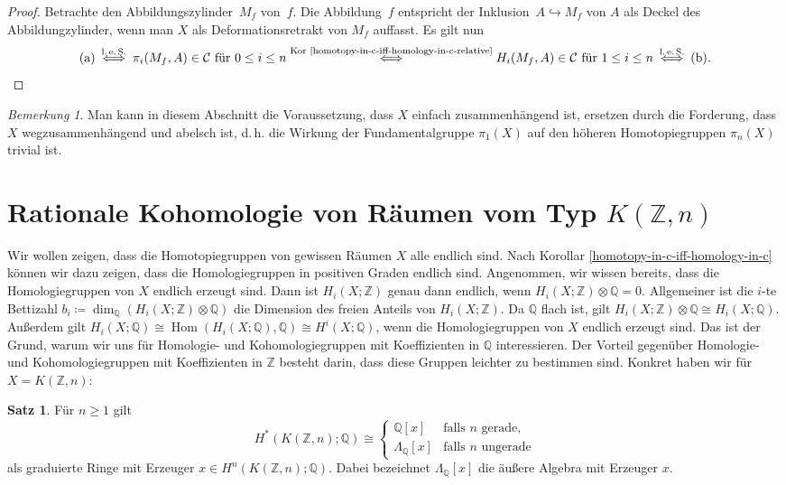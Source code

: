 \documentclass[11pt, a4paper, german]{article}
\theoremstyle{definition}
\newtheorem{satz}[lem]{Satz}
\theoremstyle{remark}
\newtheorem*{bem}{Bemerkung}
\newcommand{\Z}{\mathbb{Z}} %
\newcommand{\Q}{\mathbb{Q}} %
\DeclareMathOperator{\Hom}{Hom} %
\newcommand{\SC}{\mathcal{C}} %
\renewcommand{\dh}{d.\,h.} %
\begin{document}
\begin{proof}
  Betrachte den Abbildungszylinder~$M_f$ von~$f$.
  Die Abbildung~$f$ entspricht der Inklusion~$A \hookrightarrow M_f$ von $A$ als Deckel des Abbildungzylinder, wenn man $X$ als Deformationsretrakt von $M_f$ auffasst.
  Es gilt nun
  \[
    \text{(a)}
    \stackrel{\text{l.\,e.\,S.}}{\iff}
    \pi_i(M_f, A) \in \SC \text{ für } 0 \leq i \leq n
    \stackrel{\text{Kor \ref{homotopy-in-c-iff-homology-in-c-relative}}}{\iff}
    H_i(M_f, A) \in \SC \text{ für } 1 \leq i \leq n
    \stackrel{\text{l.\,e.\,S.}}{\iff}
    \text{(b)}.
    \qedhere
  \]
\end{proof}

\begin{bem}
  Man kann in diesem Abschnitt die Voraussetzung, dass $X$ einfach zusammenhängend ist, ersetzen durch die Forderung, dass $X$ wegzusammenhängend und abelsch ist, \dh{} die Wirkung der Fundamentalgruppe $\pi_1(X)$ auf den höheren Homotopiegruppen $\pi_n(X)$ trivial ist.
\end{bem}

\section{Rationale Kohomologie von Räumen vom Typ $K(\Z, n)$}

Wir wollen zeigen, dass die Homotopiegruppen von gewissen Räumen $X$ alle endlich sind.
Nach Korollar \ref{homotopy-in-c-iff-homology-in-c} können wir dazu zeigen, dass die Homologiegruppen in positiven Graden endlich sind.
Angenommen, wir wissen bereits, dass die Homologiegruppen von $X$ endlich erzeugt sind.
Dann ist $H_i(X; \Z)$ genau dann endlich, wenn $H_i(X; \Z) \otimes \Q = 0$.
Allgemeiner ist die $i$-te Bettizahl $b_i \coloneqq \dim_\Q(H_i(X; \Z) \otimes \Q)$ die Dimension des freien Anteils von $H_i(X; \Z)$.
Da $\Q$ flach ist, gilt $H_i(X; \Z) \otimes \Q \cong H_i(X; \Q)$.
Außerdem gilt $H_i(X; \Q) \cong \Hom(H_i(X; \Q), \Q) \cong H^i(X; \Q)$, wenn die Homologiegruppen von $X$ endlich erzeugt sind.
Das ist der Grund, warum wir uns für Homologie- und Kohomologiegruppen mit Koeffizienten in $\Q$ interessieren.
Der Vorteil gegenüber Homologie- und Kohomologiegruppen mit Koeffizienten in $\Z$ besteht darin, dass diese Gruppen leichter zu bestimmen sind.
Konkret haben wir für $X = K(\Z, n)$:

\begin{satz}\label{rational-homology-kzn}
  Für $n \geq 1$ gilt
  \vspace{-1em}
  \[
    H^*(K(\Z, n); \Q) \cong \begin{cases}
      \Q[x] & \text{falls $n$ gerade}, \\
      \Lambda_\Q[x] & \text{falls $n$ ungerade}
    \end{cases}
  \]
  als graduierte Ringe mit Erzeuger $x \in H^n(K(\Z, n); \Q)$.
  Dabei bezeichnet $\Lambda_\Q[x]$ die äußere Algebra mit Erzeuger $x$.
\end{satz}
\end{document}
